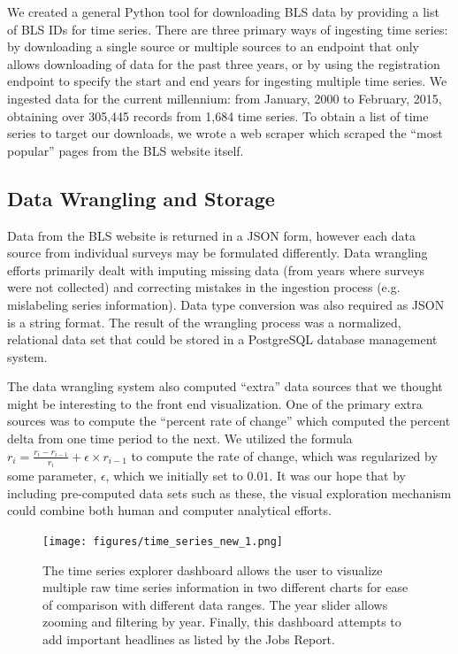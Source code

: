 \documentclass{sigchi}
\begin{document}
We created a general Python tool for downloading BLS data by providing a list of BLS IDs for time series. There are three primary ways of ingesting time series: by downloading a single source or multiple sources to an endpoint that only allows downloading of data for the past three years, or by using the registration endpoint to specify the start and end years for ingesting multiple time series. We ingested data for the current millennium: from January, 2000 to February, 2015, obtaining over 305,445 records from 1,684 time series. To obtain a list of time series to target our downloads, we wrote a web scraper which scraped the ``most popular'' pages from the BLS website itself.

\subsection{Data Wrangling and Storage}

Data from the BLS website is returned in a JSON form, however each data source from individual surveys may be formulated differently. Data wrangling efforts primarily dealt with imputing missing data (from years where surveys were not collected) and correcting mistakes in the ingestion process (e.g. mislabeling series information). Data type conversion was also required as JSON is a string format. The result of the wrangling process was a normalized, relational data set that could be stored in a PostgreSQL database management system.

The data wrangling system also computed ``extra'' data sources that we thought might be interesting to the front end visualization. One of the primary extra sources was to compute the ``percent rate of change'' which computed the percent delta from one time period to the next. We utilized the formula $r_i = \frac{r_i - r_{i-1}}{r_i} + \epsilon \times r_{i-1}$ to compute the rate of change, which was regularized by some parameter, $\epsilon$, which we initially set to $0.01$.  It was our hope that by including pre-computed data sets such as these, the visual exploration mechanism could combine both human and computer analytical efforts.

\begin{figure}[!ht]
    \centering
    \texttt{[image: figures/time\_series\_new\_1.png]}
    \caption{The time series explorer dashboard allows the user to visualize multiple raw time series information in two different charts for ease of comparison with different data ranges. The year slider allows zooming and filtering by year. Finally, this dashboard attempts to add important headlines as listed by the Jobs Report.}
    \label{fig:time_series}
\end{figure}
\end{document}
